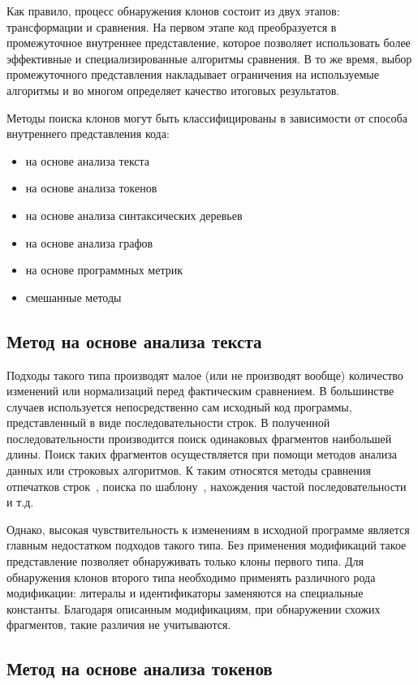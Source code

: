 Как правило, процесс обнаружения клонов состоит из двух этапов: трансформации и сравнения. На первом этапе код преобразуется в промежуточное внутреннее представление, которое позволяет использовать более эффективные и специализированные алгоритмы сравнения. В то же время, выбор промежуточного представления накладывает ограничения на используемые алгоритмы и во многом определяет качество итоговых результатов.

Методы поиска клонов могут быть классифицированы в зависимости от способа внутреннего представления кода:
\begin{itemize}
\setlength\itemsep{0mm}
\item на основе анализа текста
\item на основе анализа токенов
\item на основе анализа синтаксических деревьев
\item на основе анализа графов
\item на основе программных метрик
\item смешанные методы
\end{itemize}

\subsection{Метод на основе анализа текста}

Подходы такого типа производят малое (или не производят вообще) количество изменений или нормализаций перед фактическим сравнением. В большинстве случаев используется непосредственно сам исходный код программы, представленный в виде последовательности строк. В полученной последовательности производится поиск одинаковых фрагментов наибольшей длины. Поиск таких фрагментов осуществляется при помощи методов анализа данных или строковых алгоритмов. К таким относятся методы сравнения отпечатков строк~\cite{fingerprints}, поиска по шаблону~\cite{templates2}, нахождения частой последовательности~\cite{sequence} и т.д.

Однако, высокая чувствительность к изменениям в исходной программе является главным недостатком подходов такого типа. Без применения модификаций такое представление позволяет обнаруживать только клоны первого типа. Для обнаружения клонов второго типа необходимо применять различного рода модификации: литералы и идентификаторы заменяются на специальные константы. Благодаря описанным модификациям, при обнаружении схожих фрагментов, такие различия не учитываются.

\subsection{Метод на основе анализа токенов}

